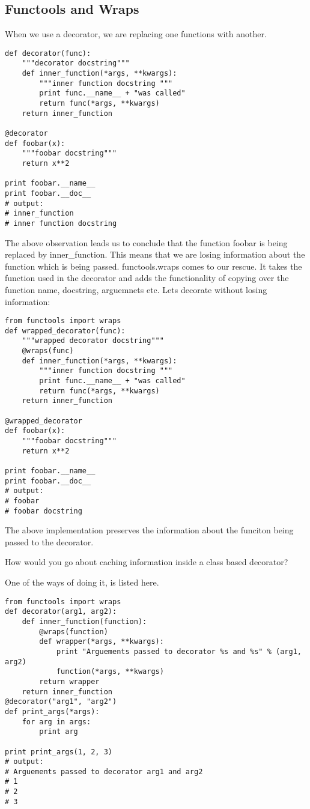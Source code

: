 \documentclass[10pt,a4paper]{ctexbook}
\begin{document}
\subsection{Functools and Wraps}
When we use a decorator, we are replacing one functions with another.

\begin{verbatim}
def decorator(func):
    """decorator docstring"""
    def inner_function(*args, **kwargs):
        """inner function docstring """
        print func.__name__ + "was called"
        return func(*args, **kwargs)
    return inner_function

@decorator
def foobar(x):
    """foobar docstring"""
    return x**2

print foobar.__name__
print foobar.__doc__
# output:
# inner_function
# inner function docstring
\end{verbatim}

The above observation leads us to conclude that the function foobar is being replaced by inner\_function. This means that we are losing information about the function which is being passed. functools.wraps comes to our rescue. It takes the function used in the decorator and adds the functionality of copying over the function name, docstring, arguemnets etc. Lets decorate without losing information:

\begin{verbatim}
from functools import wraps
def wrapped_decorator(func):
    """wrapped decorator docstring"""
    @wraps(func)
    def inner_function(*args, **kwargs):
        """inner function docstring """
        print func.__name__ + "was called"
        return func(*args, **kwargs)
    return inner_function

@wrapped_decorator
def foobar(x):
    """foobar docstring"""
    return x**2

print foobar.__name__
print foobar.__doc__
# output:
# foobar
# foobar docstring
\end{verbatim}
The above implementation preserves the information about the funciton being passed to the decorator.

How would you go about caching information inside a class based decorator?

One of the ways of doing it, is listed here.
\begin{verbatim}
from functools import wraps
def decorator(arg1, arg2):
    def inner_function(function):
        @wraps(function)
        def wrapper(*args, **kwargs):
            print "Arguements passed to decorator %s and %s" % (arg1, arg2)
            function(*args, **kwargs)
        return wrapper
    return inner_function
@decorator("arg1", "arg2")
def print_args(*args):
    for arg in args:
        print arg

print print_args(1, 2, 3)
# output:
# Arguements passed to decorator arg1 and arg2
# 1
# 2
# 3
\end{verbatim}
\end{document}
